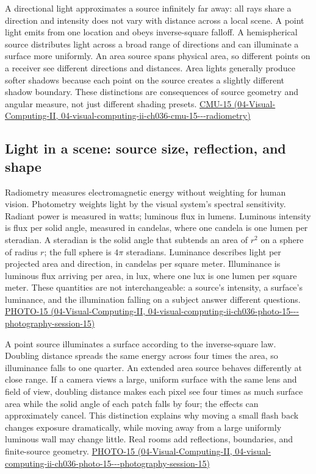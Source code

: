 A directional light approximates a source infinitely far away: all rays share a direction and intensity does not vary with distance across a local scene. A point light emits from one location and obeys inverse-square falloff. A hemispherical source distributes light across a broad range of directions and can illuminate a surface more uniformly. An area source spans physical area, so different points on a receiver see different directions and distances. Area lights generally produce softer shadows because each point on the source creates a slightly different shadow boundary. These distinctions are consequences of source geometry and angular measure, not just different shading presets. \href{../04-Visual-Computing-II/main.pdf\#nameddest=04-visual-computing-ii-ch036-cmu-15---radiometry}{CMU-15 (04-Visual-Computing-II, 04-visual-computing-ii-ch036-cmu-15-\/-\/-radiometry)}

\subsection{Light in a scene: source size, reflection, and shape}\label{03-visual-computing-i-ch004-light-in-a-scene-source-size-reflection-and-shape}

Radiometry measures electromagnetic energy without weighting for human vision. Photometry weights light by the visual system's spectral sensitivity. Radiant power is measured in watts; luminous flux in lumens. Luminous intensity is flux per solid angle, measured in candelas, where one candela is one lumen per steradian. A steradian is the solid angle that subtends an area of \(r^2\) on a sphere of radius \(r\); the full sphere is \(4\pi\) steradians. Luminance describes light per projected area and direction, in candelas per square meter. Illuminance is luminous flux arriving per area, in lux, where one lux is one lumen per square meter. These quantities are not interchangeable: a source's intensity, a surface's luminance, and the illumination falling on a subject answer different questions. \href{../04-Visual-Computing-II/main.pdf\#nameddest=04-visual-computing-ii-ch036-photo-15---photography-session-15}{PHOTO-15 (04-Visual-Computing-II, 04-visual-computing-ii-ch036-photo-15-\/-\/-photography-session-15)}

A point source illuminates a surface according to the inverse-square law. Doubling distance spreads the same energy across four times the area, so illuminance falls to one quarter. An extended area source behaves differently at close range. If a camera views a large, uniform surface with the same lens and field of view, doubling distance makes each pixel see four times as much surface area while the solid angle of each patch falls by four; the effects can approximately cancel. This distinction explains why moving a small flash back changes exposure dramatically, while moving away from a large uniformly luminous wall may change little. Real rooms add reflections, boundaries, and finite-source geometry. \href{../04-Visual-Computing-II/main.pdf\#nameddest=04-visual-computing-ii-ch036-photo-15---photography-session-15}{PHOTO-15 (04-Visual-Computing-II, 04-visual-computing-ii-ch036-photo-15-\/-\/-photography-session-15)}

